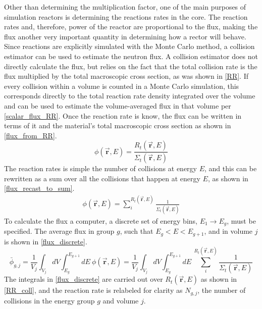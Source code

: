 Other than determining the multiplication factor, one of the main purposes of simulation reactors is determining the reactions rates in the core.  The reaction rates and, therefore, power of the reactor are proportional to the flux, making the flux another very important quantity in determining how a rector will behave.  Since reactions are explicitly simulated with the  Monte Carlo method, a collision estimator can be used to estimate the neutron flux.  A collision estimator does not directly calculate the flux, but relies on the fact that the total collision rate is the flux multiplied by the total macroscopic cross section, as was shown in \eqref{RR}.  If every collision within a volume is counted in a Monte Carlo simulation, this corresponds directly to the total reaction rate density integrated over the volume and can be used to estimate the volume-averaged flux in that volume per \eqref{scalar_flux_RR}.  Once the reaction rate is know, the flux can be written in terms of it and the material's total macroscopic cross section as shown in \eqref{flux_from_RR}.
%
\begin{equation}
\label{flux_from_RR}
\phi(\boldsymbol{\vec{r}},E) = \frac{ R_t(\boldsymbol{\vec{r}},E) }{  \Sigma_t(\boldsymbol{\vec{r}},E) }
\end{equation}
%
The reaction rates is simple the number of collisions at energy $E$, and this can be rewritten as a sum over all the collisions that happen at energy $E$, as shown in \eqref{flux_recast_to_sum}.
%
\begin{equation}
\label{flux_recast_to_sum}
\begin{gathered}
\phi(\boldsymbol{\vec{r}},E) = \sum_{i}^{R_t(\boldsymbol{\vec{r}},E)} \frac{ 1 }{  \Sigma_t(\boldsymbol{\vec{r}},E) }
\end{gathered}
\end{equation}
%
To calculate the flux a computer, a discrete set of energy bins, $E_1 \rightarrow E_g$, must be specified.  The average flux in group $g$, such that $E_g < E < E_{g+1}$, and in volume $j$ is shown in \eqref{flux_discrete}.
%
\begin{equation}
\label{flux_discrete}
\bar{\phi}_{g,j} = \frac{1}{V_j} \int_{V_j} dV \int_{E_g}^{E_{g+1}} dE \: \phi(\boldsymbol{\vec{r}},E) = \frac{1}{V_j} \int_{V_j} dV \int_{E_g}^{E_{g+1}} dE \: \sum_{i}^{R_t(\boldsymbol{\vec{r}},E)} \frac{ 1 }{  \Sigma_t(\boldsymbol{\vec{r}},E) }
\end{equation}
%
The integrals in \eqref{flux_discrete} are carried out over $R_t(\boldsymbol{\vec{r}},E)$ as shown in \eqref{RR_coll}, and the reaction rate is relabeled for clarity as $N_{g,j}$, the number of collisions in the energy group $g$ and volume $j$. 
